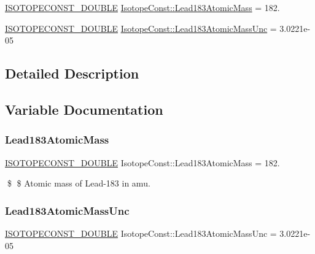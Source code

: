 \begin{DoxyCompactItemize}
\item 
\mbox{\hyperlink{group___isotope_const-_macros_ga8f45a7272ce02c0b4c65c44636ed719a}{I\+S\+O\+T\+O\+P\+E\+C\+O\+N\+S\+T\+\_\+\+D\+O\+U\+B\+LE}} \mbox{\hyperlink{group___isotope_const-_lead-_pb183_ga84c60dbc412f4be5508691ee8aa07558}{Isotope\+Const\+::\+Lead183\+Atomic\+Mass}} = 182.
\item 
\mbox{\hyperlink{group___isotope_const-_macros_ga8f45a7272ce02c0b4c65c44636ed719a}{I\+S\+O\+T\+O\+P\+E\+C\+O\+N\+S\+T\+\_\+\+D\+O\+U\+B\+LE}} \mbox{\hyperlink{group___isotope_const-_lead-_pb183_gaf343b09c5cc1648e42a1da3564164997}{Isotope\+Const\+::\+Lead183\+Atomic\+Mass\+Unc}} = 3.\+0221e-\/05
\end{DoxyCompactItemize}


\subsection{Detailed Description}


\subsection{Variable Documentation}
\mbox{\label{group___isotope_const-_lead-_pb183_ga84c60dbc412f4be5508691ee8aa07558}} 
\subsubsection{\texorpdfstring{Lead183\+Atomic\+Mass}{Lead183AtomicMass}}
{\footnotesize\ttfamily \mbox{\hyperlink{group___isotope_const-_macros_ga8f45a7272ce02c0b4c65c44636ed719a}{I\+S\+O\+T\+O\+P\+E\+C\+O\+N\+S\+T\+\_\+\+D\+O\+U\+B\+LE}} Isotope\+Const\+::\+Lead183\+Atomic\+Mass = 182.}

\$ \$ Atomic mass of Lead-\/183 in amu. \mbox{\label{group___isotope_const-_lead-_pb183_gaf343b09c5cc1648e42a1da3564164997}} 
\subsubsection{\texorpdfstring{Lead183\+Atomic\+Mass\+Unc}{Lead183AtomicMassUnc}}
{\footnotesize\ttfamily \mbox{\hyperlink{group___isotope_const-_macros_ga8f45a7272ce02c0b4c65c44636ed719a}{I\+S\+O\+T\+O\+P\+E\+C\+O\+N\+S\+T\+\_\+\+D\+O\+U\+B\+LE}} Isotope\+Const\+::\+Lead183\+Atomic\+Mass\+Unc = 3.\+0221e-\/05}

